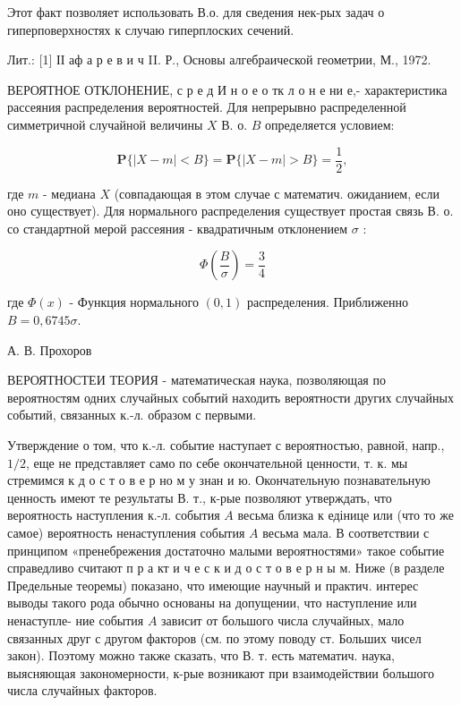 \documentclass[10pt]{article}
\begin{document}
Этот факт позволяет использовать В.о. для сведения нек-рых задач о гиперповерхностях к случаю гиперплоских сечений.



Лит.: [1] ІІ аф а р е в и ч II. Р., Основы алгебраической геометрии, М., 1972.



ВЕРОЯТНОЕ ОТКЛОНЕНИЕ, с р е д И н о е о тк л о н е ни е,- характеристика рассеяния распределения вероятностей. Для непрерывно распределенной симметричной случайной величины $X$ В. о. $B$ определяется условием:



\[

\mathbf{P}\{|X-m|<B\}=\mathbf{P}\{|X-m|>B\}=\frac{1}{2},

\]



где $m$ - медиана $X$ (совпадающая в этом случае с математич. ожиданием, если оно существует). Для нормального распределения существует простая связь В. о. со стандартной мерой рассеяния - квадратичным отклонением $\sigma$ :



\[

\Phi\left(\frac{B}{\sigma}\right)=\frac{3}{4}

\]



где $\Phi(x)$ - Функция нормального $(0,1)$ распределения. Приближенно $B=0,6745 \sigma$.



А. В. Прохоров



ВЕРОЯТНОСТЕИ ТЕОРИЯ - математическая наука, позволяющая по вероятностям одних случайных событий находить вероятности других случайных событий, связанных к.-л. образом с первыми.



Утверждение о том, что к.-л. событие наступает с вероятностью, равной, напр., $1 / 2$, еще не представляет само по себе окончательной ценности, т. к. мы стремимся к д о с т о в е р но м у знан и ю. Окончательную познавательную ценность имеют те результаты В. т., к-рые позволяют утверждать, что вероятность наступления к.-л. события $A$ весьма близка к едінице или (что то же самое) вероятность ненаступления события $A$ весьма мала. В соответствии с принципом «пренебрежения достаточно малыми вероятностями» такое событие справедливо считают п р а кт и ч е с к и д о с т о в е р н ы м. Ниже (в разделе Предельные теоремы) показано, что имеющие научный и практич. интерес выводы такого рода обычно основаны на допущении, что наступление или ненаступле- ние события $A$ зависит от большого числа случайных, мало связанных друг с другом факторов (см. по этому поводу ст. Больших чисел закон). Поэтому можно также сказать, что В. т. есть математич. наука, выясняющая закономерности, к-рые возникают при взаимодействии большого числа случайных факторов.
\end{document}
